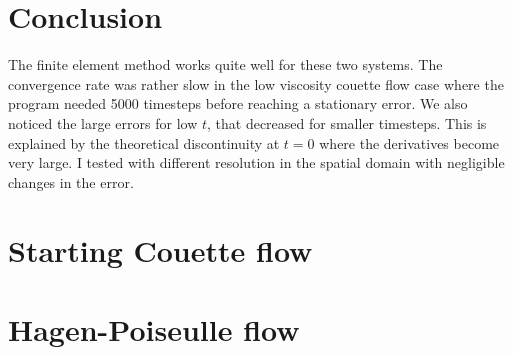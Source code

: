 \documentclass[a4paper,10pt]{article}
\renewcommand{\(}{\left(}
\renewcommand{\)}{\right)}
\begin{document}
\section{Conclusion}
The finite element method works quite well for these two systems. The convergence rate was rather slow in the low viscosity couette flow case where the program needed 5000 timesteps before reaching a stationary error. We also noticed the large errors for low $t$, that decreased for smaller timesteps. This is explained by the theoretical discontinuity at $t=0$ where the derivatives become very large. I tested with different resolution in the spatial domain with negligible changes in the error. 
\begin{appendices}
  \gdef\thesection{Appendix \Alph{section}}
  \section{Starting Couette flow}
  \label{ap:a}
  
  
  \section{Hagen-Poiseulle flow}
  \label{ap:b}
  
  
\end{appendices}


\printbibliography
\end{document}
